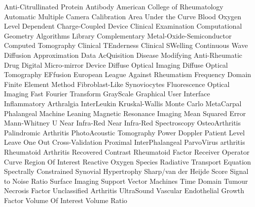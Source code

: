 \documentclass[twoside]{bhamthesis}
\theoremstyle{definition}
\begin{document}
\begin{acronym}[DMARDDDDD]\itemsep0pt  %

     Anti-Citrullinated Protein Antibody
      American College of Rheumatology
     Automatic Multiple Camera Calibration 
      Area Under the Curve
     Blood Oxygen Level Dependent
      Charge-Coupled Device
       Clinical Examination
     Computational Geometry Algorithms Library 
     Complementary Metal-Oxide-Semiconductor
       Computed Tomography
      Clinical TEnderness
      Clinical SWelling 
       Continuous Wave 
       Diffusion Approximation 
      Data AcQuisition
    Disease Modifying Anti-Rheumatic Drug
      Digital Micro-mirror Device 
      Diffuse Optical Imaging
      Diffuse Optical Tomography
       EFfusion
    European League Against Rheumatism
       Frequency Domain
      Finite Element Method
      Fibroblast-Like Synoviocytes
      Fluorescence Optical Imaging
      Fast Fourier Transform
       GrayScale
    	 Graphical User Interface
       Inflammatory Arthralgia
       InterLeukin
       Kruskal-Wallis
       Monte Carlo
      MetaCarpal Phalangeal
       Machine Leaning
      Magnetic Resonance Imaging
      Mean Squared Error
      Mann-Whitney U 
      Near Infra-Red
     Near Infra-Red Spectroscopy
       OsteoArthritis
       Palindromic Arthritis
      PhotoAcoustic Tomography 
       Power Doppler
 Patient Level Leave One Out Cross-Validation 
      Proximal InterPhalangeal
       ParvoVirus arthritis 
       Rheumatoid Arthritis
       Recovered Contrast
       Rheumatoid Factor
      Receiver Operator Curve
      Region Of Interest
      Reactive Oxygen Species
      Radiative Transport Equation
       Spectrally Constrained
       Synovial Hypertrophy
      Sharp/van der Heijde Score
      Signal to Noise Ratio
       Surface Imaging
      Support Vector Machines 
       Time Domain
      Tumour Necrosis Factor
       Unclassified Arthritis
       UltraSound
     Vascular Endothelial Growth Factor
      Volume Of Interest
       Volume Ratio
 
\end{acronym}
\end{document}
